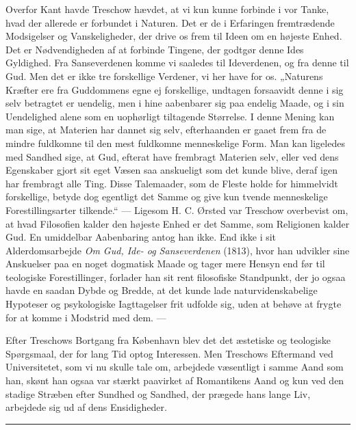 \documentclass[12pt,a4paper,openany]{book}
\newcommand{\opage}[1]{\marginnote{\footnotesize\textit{[#1]}}}
\begin{document}
Overfor Kant havde Treschow hævdet, at vi kun kunne forbinde i vor Tanke, hvad
der allerede er forbundet i Naturen. Det er de i Erfaringen fremtrædende
Modsigelser og Vanskeligheder, der drive os frem til Ideen om en højeste Enhed.
Det er Nødvendigheden af at forbinde Tingene, der godtgør denne Ides Gyldighed.
Fra Sanseverdenen komme vi saaledes til Ideverdenen, og fra denne til Gud. Men
det er ikke tre forskellige Verdener, vi her have for os. „Naturens Kræfter ere
fra Guddommens egne ej forskellige, undtagen forsaavidt denne i sig selv
betragtet er uendelig, men i hine aabenbarer sig paa endelig Maade, og i sin
Uendelighed alene som en uophørligt tiltagende Størrelse. I denne Mening kan
man sige, at Materien har dannet sig selv, efterhaanden er gaaet frem fra de
mindre fuldkomne til den mest fuldkomne menneskelige Form. Man kan ligeledes
med Sandhed sige, at Gud, efterat have frembragt Materien selv, eller ved dens
Egenskaber gjort sit eget Væsen saa anskueligt som det kunde blive, deraf igen
har frembragt alle Ting. Disse Talemaader, som de Fleste holde for himmelvidt
forskellige, betyde dog egentligt det Samme og give kun tvende menneskelige
Forestillingsarter tilkende.“ --- Ligesom H. C. Ørsted var Treschow overbevist
om, at hvad Filosofien kalder den højeste Enhed er det Samme, som Religionen
kalder Gud. En umiddelbar Aabenbaring antog han ikke. End ikke i sit
Alderdomsarbejde \textit{Om Gud, Ide- og Sanseverdenen} (1813), hvor han
udvikler sine Anskuelser paa en noget dogmatisk Maade og tager mere Hensyn end
før til teologiske Forestillinger, forlader han sit rent filosofiske
Standpunkt, der jo ogsaa havde en saadan Dybde og Bredde, at det kunde lade
naturvidenskabelige Hypoteser og psykologiske Iagttagelser frit udfolde sig,
uden at behøve at frygte for at komme i Modstrid med dem. ---

Efter Treschows Bortgang fra København blev det det æstetiske og teologiske
Spørgsmaal, der for lang Tid optog Interessen. Men Treschows Eftermand ved
Universitetet, som
\setcounter{footnote}{0}%
\opage{96}vi nu skulle tale om, arbejdede væsentligt i samme Aand som han,
skønt han ogsaa var stærkt paavirket af Romantikens Aand og kun ved den stadige
Stræben efter Sundhed og Sandhed, der prægede hans lange Liv, arbejdede sig ud
af dens Ensidigheder.

\begin{center}\rule{2cm}{0.4pt}\end{center}

\setcounter{footnote}{0}%
\opage{97}
\end{document}
